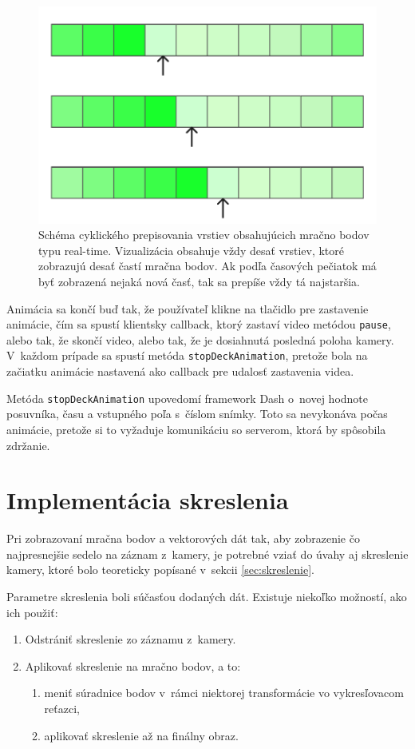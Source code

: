 \begin{figure}[t]
    \centering
    \includegraphics[width=0.4\linewidth]{text_prace/obrazky-figures/vrstvy_animacia.pdf}
    \caption[Schéma cyklického prepisovania vrstiev obsahujúcich mračno bodov typu real-time.]{Schéma cyklického prepisovania vrstiev obsahujúcich mračno bodov typu real-time. Vizualizácia obsahuje vždy desať vrstiev, ktoré zobrazujú desať častí mračna bodov. Ak podľa časových pečiatok má byť zobrazená nejaká nová časť, tak sa prepíše vždy tá najstaršia.}
    \label{fig:vrstvy_animacia}
\end{figure}

Animácia sa končí buď tak, že používateľ klikne na tlačidlo pre zastavenie animácie, čím sa spustí klientsky callback, ktorý zastaví video metódou \texttt{pause}, alebo tak, že skončí video, alebo tak, že je dosiahnutá posledná poloha kamery. V~každom prípade sa spustí metóda \texttt{stopDeckAnimation}, pretože bola na začiatku animácie nastavená ako callback pre udalosť zastavenia videa.

Metóda \texttt{stopDeckAnimation} upovedomí framework Dash o~novej hodnote posuvníka, času a vstupného poľa s~číslom snímky. Toto sa nevykonáva počas animácie, pretože si to vyžaduje komunikáciu so serverom, ktorá by spôsobila zdržanie.

\section{Implementácia skreslenia}
\label{sec:implementacia_skreslenia}

Pri zobrazovaní mračna bodov a vektorových dát tak, aby zobrazenie čo najpresnejšie sedelo na záznam z~kamery, je potrebné vziať do úvahy aj skreslenie kamery, ktoré bolo teoreticky popísané v~sekcii \ref{sec:skreslenie}. 

Parametre skreslenia boli súčasťou dodaných dát. Existuje niekoľko možností, ako ich použiť:
\begin{enumerate}
    \item Odstrániť skreslenie zo záznamu z~kamery.
    \item Aplikovať skreslenie na mračno bodov, a to:
    \begin{enumerate}
        \item meniť súradnice bodov v~rámci niektorej transformácie vo vykresľovacom reťazci,
        \item aplikovať skreslenie až na finálny obraz.
    \end{enumerate}
\end{enumerate}

